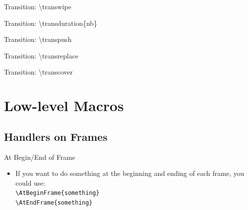 \documentclass[english,sectioncirclenumberstyle]{ciadbeamer}
\begin{document}
\begin{frame}[c]{Transition: {\textbackslash}transwipe}
	\transwipe
	\begin{center}
	\end{center}
\end{frame}

\begin{frame}[c]{Transition: {\textbackslash}transduration\{nb\}}
	\begin{center}
	\end{center}
\end{frame}

\begin{frame}[c]{Transition: {\textbackslash}transpush}
	\transpush
	\begin{center}
	\end{center}
\end{frame}

\begin{frame}[c]{Transition: {\textbackslash}transreplace}
	\transreplace
	\begin{center}
	\end{center}
\end{frame}

\begin{frame}[c]{Transition: {\textbackslash}transcover}
	\transcover
	\begin{center}
	\end{center}
\end{frame}



\section{Low-level Macros}
\sectiontableofcontentslide

\subsection{Handlers on Frames}

\begin{frame}{At Begin/End of Frame}
	\begin{itemize}
	\item If you want to do something at the beginning and ending of each frame, you could use: \\
		\texttt{{\textbackslash}AtBeginFrame\{something\}} \\
		\texttt{{\textbackslash}AtEndFrame\{something\}}
	\end{itemize}
\end{frame}
\end{document}
